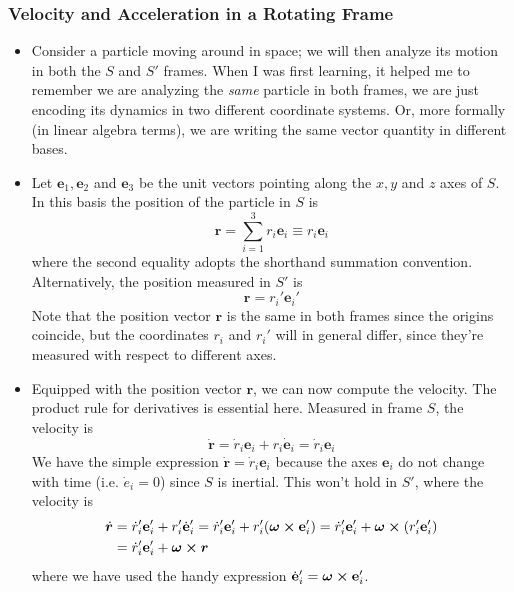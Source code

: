\documentclass[11pt, a4paper]{article}
\newcommand{\e}{\mathbf{e}} %
\newcommand{\bdot}[1]{\dot{\bm{#1}}} %
\begin{document}
\subsubsection{Velocity and Acceleration in a Rotating Frame}
\begin{itemize}
	\item Consider a particle moving around in space; we will then analyze its motion in both the $ S $ and $ S' $ frames. When I was first learning, it helped me to remember we are analyzing the \textit{same} particle in both frames, we are just encoding its dynamics in two different coordinate systems. Or, more formally (in linear algebra terms), we are writing the same vector quantity in different bases.
	
	\item Let $ \e_{1}, \e_{2} $ and $ \e_{3} $ be the unit vectors pointing along the $ x, y $ and $ z $ axes of $ S $. In this basis the position of the particle in $ S $ is 
	\begin{equation*}
		\bm{r} = \sum_{i=1}^{3}r_{i}\e_{i} \equiv r_{i}\e_{i}
	\end{equation*}
	where the second equality adopts the shorthand summation convention. Alternatively, the position measured in $ S' $ is
	\begin{equation*}
		\bm{r} = r_{i}'\e_{i}'
	\end{equation*}
	Note that the position vector $ \bm{r} $ is the same in both frames since the origins coincide, but the coordinates $ r_{i} $ and $ r_{i}' $ will in general differ, since they're measured with respect to different axes.
	
	\item Equipped with the position vector $ \bm{r} $, we can now compute the velocity. The product rule for derivatives is essential here. Measured in frame $ S $, the velocity is
	\begin{equation*}
		\bdot{r} = \dot{r}_{i}\e_{i} + r_{i}\dot{\e}_{i} =  \dot{r}_{i}\e_{i}
	\end{equation*}
	We have the simple expression $ \bdot{r} = \dot{r}_{i}\e_{i} $ because the axes $ \e_{i} $ do not change with time (i.e. $ \dot{e}_{i} = 0 $) since $ S $ is inertial. This won't hold in $ S' $, where the velocity is
	\begin{align*}
		\bdot{r} &= \dot{r}_{i}'\e_{i}' + r_{i}'\dot{\e}_{i}' =\dot{r}_{i}'\e_{i}' + r_{i}'(\bm{\omega} \cross \e_{i}') = \dot{r}_{i}'\e_{i}' + \bm{\omega} \cross (r_{i}' \e_{i}')\\
		&= \dot{r}_{i}'\e_{i}' + \bm{\omega} \cross \bm{r}
	\end{align*}
	where we have used the handy expression $ \dot{\e}_{i}' = \bm{\omega}\cross \e_{i}' $.
	

\end{itemize}
\end{document}
